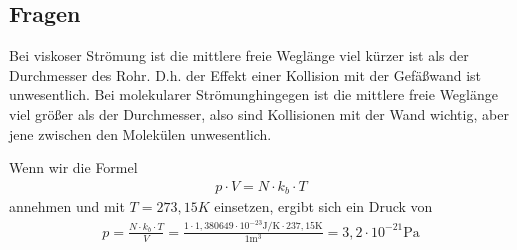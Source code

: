\documentclass[11pt, a4paper]{article}
\begin{document}
    \subsection{Fragen}
    Bei viskoser Strömung ist die mittlere freie Weglänge viel kürzer ist als der Durchmesser des Rohr. D.h. der Effekt einer Kollision mit der Gefäßwand ist unwesentlich. Bei molekularer Strömunghingegen ist die mittlere freie Weglänge viel größer als der Durchmesser, also sind Kollisionen mit der Wand wichtig, aber jene zwischen den Molekülen unwesentlich.

    Wenn wir die Formel
    \begin{align}
        p \cdot V = N \cdot k_b \cdot T
    \end{align}
    annehmen und mit $T = 273,15K$ einsetzen, ergibt sich ein Druck von
    \begin{align}
        p = \frac{N \cdot k_b \cdot T}{V} = \frac{1 \cdot 1,380649 \cdot 10^{-23} \si{\joule\per\kelvin} \cdot 237,15 \si{\kelvin}}{1 \si{\meter\cubed}} = 3,2 \cdot 10^{-21} \si{\pascal}
    \end{align}

    
    
\end{document}
